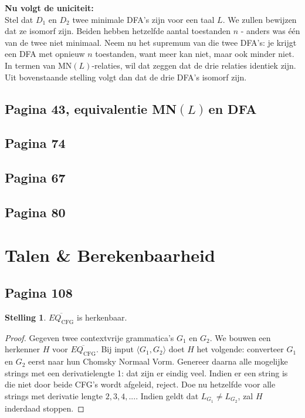 \documentclass[kulak]{kulakarticle}
\newcommand{\CFG}{\text{CFG}}
\newcommand{\mnl}{MN\((L)\)}
\newcommand{\enc}[1]{\langle #1 \rangle}
\theoremstyle{definition}
\newtheorem*{stelling}{Stelling}
\begin{document}
	\textbf{Nu volgt de uniciteit:}\\
	Stel dat \(D_1\) en \(D_2\) twee minimale DFA's zijn voor een taal \(L\). We zullen bewijzen dat ze isomorf zijn. Beiden
	hebben hetzelfde aantal toestanden \(n\) - anders was één van de twee niet minimaal. Neem nu het supremum van die twee DFA’s: je krijgt een DFA met opnieuw \(n\) toestanden, want meer kan niet, maar ook minder niet. In termen van \mnl-relaties, wil dat zeggen dat de drie relaties identiek zijn. Uit bovenstaande stelling volgt dan dat de drie DFA's isomorf zijn.

	\newpage
	\subsection*{Pagina 43, equivalentie \mnl \,en DFA}

	

	\subsection*{Pagina 74}

	

	\subsection*{Pagina 67}

	

	\newpage
	\subsection*{Pagina 80}

	

	\newpage

	\section{Talen \& Berekenbaarheid}

	\subsection*{Pagina 108}

	\begin{stelling}
		\(\overline{EQ_\CFG}\) is herkenbaar.
	\end{stelling}

	\begin{proof}
		Gegeven twee contextvrije grammatica's \(G_1\) en \(G_2\). We bouwen een herkenner \(H\) voor \(\overline{EQ_\CFG}\). Bij input \(\enc{G_1,G_2}\) doet \(H\) het volgende: converteer \(G_1\) en \(G_2\) eerst naar hun Chomsky Normaal Vorm. Genereer daarna alle mogelijke strings met een derivatielengte 1: dat zijn er eindig veel. Indien er een string is die niet door beide CFG's wordt afgeleid, reject. Doe nu hetzelfde voor alle strings met derivatie lengte \(2, 3, 4, ...\). Indien geldt dat \(L_{G_1} \neq L_{G_2}\), zal \(H\) inderdaad stoppen.
	\end{proof}
\end{document}
